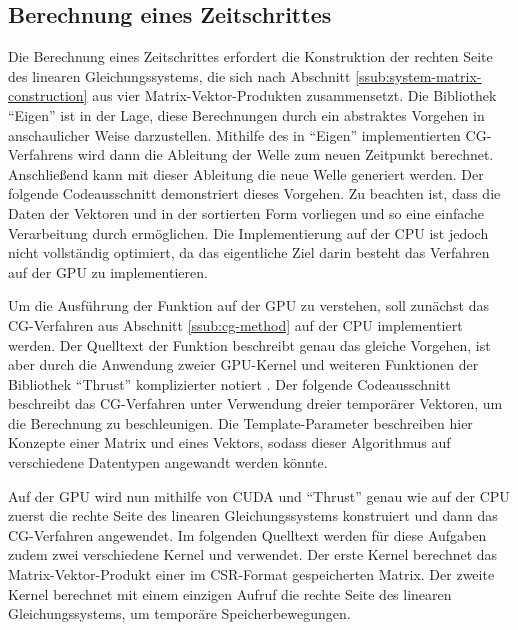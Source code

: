 \documentclass[crop=false,10pt,ngerman]{standalone}
\begin{document}
    \subsection{Berechnung eines Zeitschrittes} %
    \label{sub:time-step-computation}
      Die Berechnung eines Zeitschrittes erfordert die Konstruktion der rechten Seite des linearen Gleichungssystems, die sich nach Abschnitt \ref{ssub:system-matrix-construction} aus vier Matrix-Vektor-Produkten zusammensetzt.
      Die Bibliothek \enquote{Eigen} ist in der Lage, diese Berechnungen durch ein abstraktes Vorgehen in anschaulicher Weise darzustellen.
      Mithilfe des in \enquote{Eigen} implementierten CG-Verfahrens wird dann die Ableitung der Welle zum neuen Zeitpunkt berechnet.
      Anschließend kann mit dieser Ableitung die neue Welle generiert werden.
      Der folgende Codeausschnitt demonstriert dieses Vorgehen.
      Zu beachten ist, dass die Daten der Vektoren  und  in der sortierten Form vorliegen und so eine einfache Verarbeitung durch  ermöglichen.
      Die Implementierung auf der CPU ist jedoch nicht vollständig optimiert, da das eigentliche Ziel darin besteht das Verfahren auf der GPU zu implementieren.


      Um die Ausführung der Funktion  auf der GPU zu verstehen, soll zunächst das CG-Verfahren aus Abschnitt \ref{ssub:cg-method} auf der CPU implementiert werden.
      Der Quelltext der Funktion  beschreibt genau das gleiche Vorgehen, ist aber durch die Anwendung zweier GPU-Kernel und weiteren Funktionen der Bibliothek \enquote{Thrust} komplizierter notiert \cite{cuda2018}.
      Der folgende Codeausschnitt beschreibt das CG-Verfahren unter Verwendung dreier temporärer Vektoren, um die Berechnung zu beschleunigen.
      Die Template-Parameter beschreiben hier Konzepte einer Matrix und eines Vektors, sodass dieser Algorithmus auf verschiedene Datentypen angewandt werden könnte.


      Auf der GPU wird nun mithilfe von CUDA und \enquote{Thrust} genau wie auf der CPU zuerst die rechte Seite des linearen Gleichungssystems konstruiert und dann das CG-Verfahren angewendet.
      Im folgenden Quelltext werden für diese Aufgaben zudem zwei verschiedene Kernel  und  verwendet.
      Der erste Kernel berechnet das Matrix-Vektor-Produkt einer im CSR-Format gespeicherten Matrix.
      Der zweite Kernel berechnet mit einem einzigen Aufruf die rechte Seite des linearen Gleichungssystems, um temporäre Speicherbewegungen.
\end{document}
